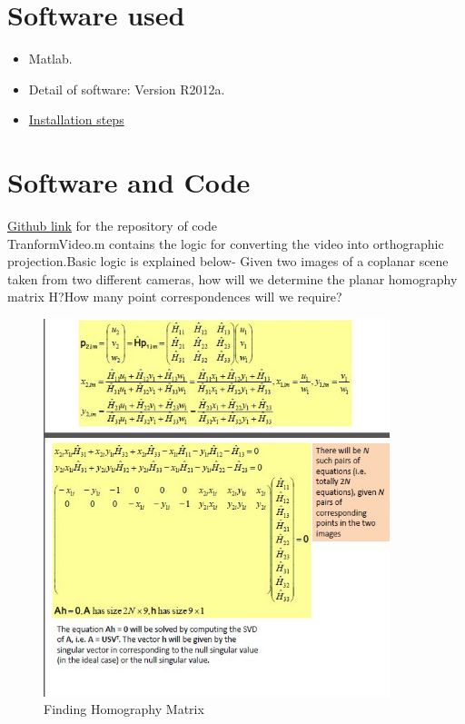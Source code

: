 \documentclass[a4paper,12pt,oneside]{book}
\begin{document}
\section{Software used}
\begin{itemize}
  \item Matlab.
  \item Detail of software: Version R2012a. 
  \item \href{https://www.youtube.com/watch?v=krEPOXPvNIg}{Installation steps}
\end{itemize}

\section{Software and Code}
\href{https://github.com/eYSIP-2016/Automatic-Theme-evaluation-from-videos}{Github link} for the repository of code\\
TranformVideo.m contains the logic for converting the video into orthographic projection.Basic logic is explained below-
Given two images of a coplanar scene taken from two different cameras, how will we determine the planar homography matrix H?How many point correspondences will we require?

    \begin{figure}[h!]
		\includegraphics[width=1\linewidth, height=11cm]{Capture-1.JPG}
		\centering
		\caption{Finding Homography Matrix}
	\end{figure}
	
\end{document}
